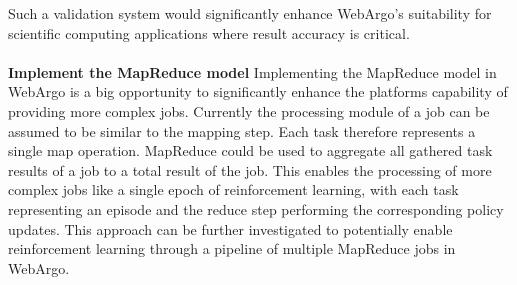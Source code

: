 Such a validation system would significantly enhance WebArgo's suitability for scientific computing applications where result accuracy is critical.
\\~\\
\textbf{Implement the MapReduce model}
\newline
Implementing the MapReduce \cite{conclusion:map-reduce} model in WebArgo is a big opportunity to significantly enhance the platforms capability of providing more complex jobs. Currently the processing module of a job can be assumed to be similar to the mapping step. Each task therefore represents a single map operation. MapReduce could be used to aggregate all gathered task results of a job to a total result of the job. This enables the processing of more complex jobs like a single epoch of reinforcement learning, with each task representing an episode and the reduce step performing the corresponding policy updates. This approach can be further investigated to potentially enable reinforcement learning through a pipeline of multiple MapReduce jobs in WebArgo.